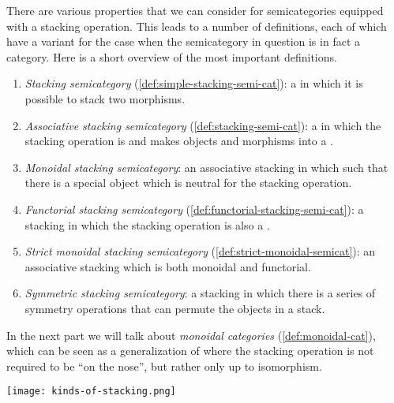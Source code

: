 There are various properties that we can consider for semicategories equipped with a stacking operation. This leads to a number of definitions, each of which have a variant for the case when the semicategory in question is in fact a category. 
Here is a short overview of the most important definitions. 
%
\begin{enumerate}
    \item \emph{Stacking semicategory} (\cref{def:simple-stacking-semi-cat}): a  in which it is possible to stack two morphisms.
    \item \emph{Associative stacking semicategory} (\cref{def:stacking-semi-cat}): a  in which the stacking operation is  and makes objects and morphisms into a .
    \item \emph{Monoidal stacking semicategory}: an associative stacking  in which such that there is a special object which is neutral for the stacking operation.
        \item \emph{Functorial stacking semicategory} (\cref{def:functorial-stacking-semi-cat}): a stacking  in which the stacking operation is also a .
     \item \emph{Strict monoidal stacking semicategory} (\cref{def:strict-monoidal-semicat}): an associative stacking  which is both monoidal and functorial.
    \item \emph{Symmetric stacking semicategory}: a stacking  in which there is a series of symmetry operations that can permute the objects in a stack.
\end{enumerate}
%
In the next part we will talk about \emph{monoidal categories} (\cref{def:monoidal-cat}), which can be seen as a generalization of   where the stacking operation is not required to be  ``on the nose'', but rather only up to isomorphism.


\begin{center}
\texttt{[image: kinds-of-stacking.png]}
\end{center}

